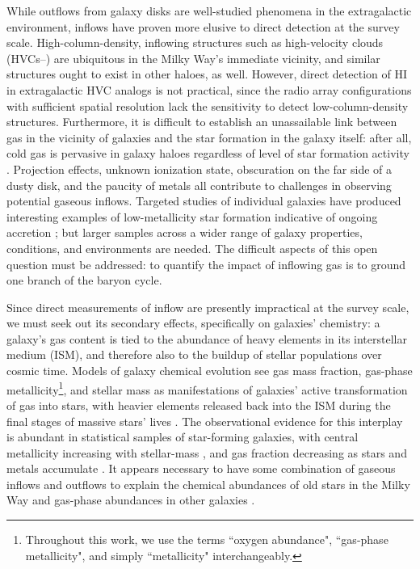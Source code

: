 While outflows from galaxy disks are well-studied phenomena in the extragalactic environment, inflows have proven more elusive to direct detection at the survey scale. High-column-density, inflowing structures such as high-velocity clouds (HVCs--\citealt{wakker_2004_hvc_bookchapter}) are ubiquitous in the Milky Way's immediate vicinity, and similar structures ought to exist in other haloes, as well. However, direct detection of HI in extragalactic HVC analogs is not practical, since the radio array configurations with sufficient spatial resolution lack the sensitivity to detect low-column-density structures. Furthermore, it is difficult to establish an unassailable link between gas in the vicinity of galaxies and the star formation in the galaxy itself: after all, cold gas is pervasive in galaxy haloes regardless of level of star formation activity \citep[e.g.,][]{bieging_78_etg-HI, sanders_80_etg-HI, zhang_2019_quiescent-HI}. Projection effects, unknown ionization state, obscuration on the far side of a dusty disk, and the paucity of metals all contribute to challenges in observing potential gaseous inflows. Targeted studies of individual galaxies have produced interesting examples of low-metallicity star formation indicative of ongoing accretion \citep{howk_2018_ngc4013-1, howk_2018_ngc4013-2, sanchez-almeida_2014}; but larger samples across a wider range of galaxy properties, conditions, and environments are needed. The difficult aspects of this open question must be addressed: to quantify the impact of inflowing gas is to ground one branch of the baryon cycle.

Since direct measurements of inflow are presently impractical at the survey scale, we must seek out its secondary effects, specifically on galaxies' chemistry: a galaxy's gas content is tied to the abundance of heavy elements in its interstellar medium (ISM), and therefore also to the buildup of stellar populations over cosmic time. Models of galaxy chemical evolution see gas mass fraction, gas-phase metallicity\footnote{Throughout this work, we use the terms ``oxygen abundance", ``gas-phase metallicity", and simply ``metallicity" interchangeably.}, and stellar mass as manifestations of galaxies' active transformation of gas into stars, with heavier elements released back into the ISM during the final stages of massive stars' lives \citep{tinsley_72, tinsley_73, vincenzo_2016_yields}. The observational evidence for this interplay is abundant in statistical samples of star-forming galaxies, with central metallicity increasing with stellar-mass \citep{tremonti_mz}, and gas fraction decreasing as stars and metals accumulate \citep{hughes_2013-gfrac-met}. It appears necessary to have some combination of gaseous inflows and outflows to explain the chemical abundances of old stars in the Milky Way \citep{spitoni_2019_mw-chemistry} and gas-phase abundances in other galaxies \citep{lilly_2013_gasreg}.

